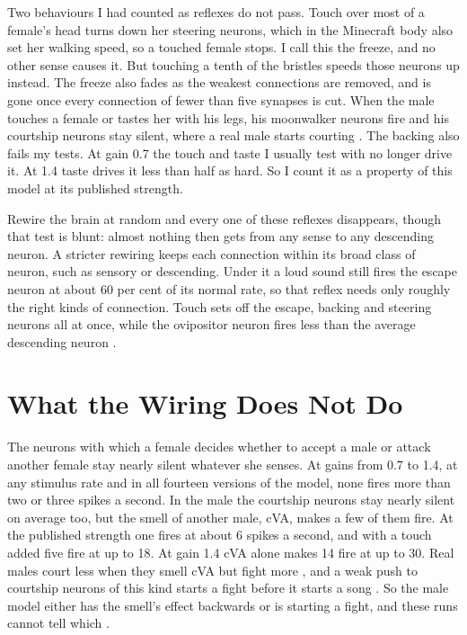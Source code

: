 Two behaviours I had counted as reflexes do not pass. Touch over most of a female's head turns down her steering neurons, which in the Minecraft body also set her walking speed, so a touched female stops. I call this the freeze, and no other sense causes it. But touching a tenth of the bristles speeds those neurons up instead. The freeze also fades as the weakest connections are removed, and is gone once every connection of fewer than five synapses is cut. When the male touches a female or tastes her with his legs, his moonwalker neurons fire and his courtship neurons stay silent, where a real male starts courting \citep{kohatsu2011female,clowney2015multimodal}. The backing also fails my tests. At gain 0.7 the touch and taste I usually test with no longer drive it. At 1.4 taste drives it less than half as hard. So I count it as a property of this model at its published strength.

Rewire the brain at random and every one of these reflexes disappears, though that test is blunt: almost nothing then gets from any sense to any descending neuron. A stricter rewiring keeps each connection within its broad class of neuron, such as sensory or descending. Under it a loud sound still fires the escape neuron at about 60 per cent of its normal rate, so that reflex needs only roughly the right kinds of connection. Touch sets off the escape, backing and steering neurons all at once, while the ovipositor neuron fires less than the average descending neuron .

\section{What the Wiring Does Not Do}
\label{sec:absent}

The neurons with which a female decides whether to accept a male or attack another female stay nearly silent whatever she senses. At gains from 0.7 to 1.4, at any stimulus rate and in all fourteen versions of the model, none fires more than two or three spikes a second. In the male the courtship neurons stay nearly silent on average too, but the smell of another male, cVA, makes a few of them fire. At the published strength one fires at about 6 spikes a second, and with a touch added five fire at up to 18. At gain 1.4 cVA alone makes 14 fire at up to 30. Real males court less when they smell cVA \citep{kurtovic2007single} but fight more \citep{wang2010identification}, and a weak push to courtship neurons of this kind starts a fight before it starts a song \citep{hoopfer2015p1}. So the male model either has the smell's effect backwards or is starting a fight, and these runs cannot tell which .

